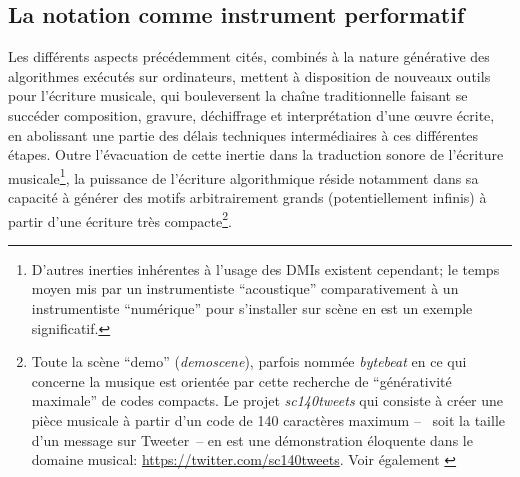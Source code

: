 \subsection{La notation comme instrument performatif}
\noindent Les différents aspects précédemment cités, combinés à la nature générative des algorithmes exécutés sur ordinateurs, mettent à disposition de nouveaux outils pour l'écriture musicale, qui bouleversent la chaîne traditionnelle faisant se succéder composition, gravure, déchiffrage et interprétation d'une œuvre écrite, en abolissant une partie des délais techniques intermédiaires à ces différentes étapes. Outre l'évacuation de cette inertie dans la traduction sonore de l'écriture musicale\footnote{D'autres inerties inhérentes à l'usage des \glspl{DMI} existent cependant; le temps moyen mis par un instrumentiste ``acoustique'' comparativement à un instrumentiste ``numérique'' pour s'installer sur scène en est un exemple significatif.}, la puissance de l'écriture algorithmique réside notamment dans sa capacité à générer des motifs arbitrairement grands (potentiellement infinis) à partir d'une écriture très compacte\footnote{Toute la scène ``demo'' (\textit{demoscene}), parfois nommée \textit{bytebeat} en ce qui concerne la musique est orientée par cette recherche de ``générativité maximale'' de codes compacts. Le projet \textit{sc140tweets} qui consiste à créer une pièce musicale à partir d'un code de 140 caractères maximum --~ soit la taille d'un message sur Tweeter~-- en est une démonstration éloquente dans le domaine musical: \url{https://twitter.com/sc140tweets}. Voir également \cite{heikkila_discovering_2011}}.\\

